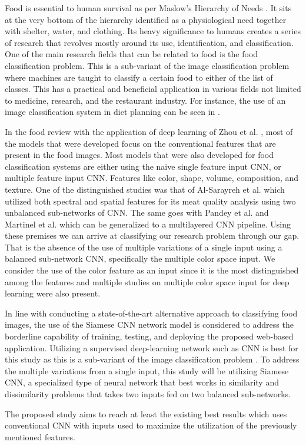 Food is essential to human survival as per Maslow’s Hierarchy of Needs \cite{Mcleod2023}. It sits at the very bottom of the hierarchy identified as a physiological need together with shelter, water, and clothing. Its heavy significance to humans creates a series of research that revolves mostly around its use, identification, and classification. One of the main research fields that can be related to food is the food classification problem. This is a sub-variant of the image classification problem where machines are taught to classify a certain food to either of the list of classes. This has a practical and beneficial application in various fields not limited to medicine, research, and the restaurant industry. For instance, the use of an image classification system in diet planning can be seen in \cite{brintha-2022,chun-2022,dong2019diet,de-kervenoael-2023}. 

In the food review with the application of deep learning of Zhou et al. \cite{zhou-2019}, most of the models that were developed focus on the conventional features that are present in the food images. Most models that were also developed for food classification systems are either using the naive single feature input CNN, or multiple feature input CNN. Features like color, shape, volume, composition, and texture. One of the distinguished studies was that of Al-Sarayreh et al. \cite{al-sarayreh-2018} which utilized both spectral and spatial features for its meat quality analysis using two unbalanced sub-networks of CNN. The same goes with Pandey et al. \cite{pandey-2017} and Martinel et al. \cite{martinel-2018} which can be generalized to a multilayered CNN pipeline. Using these premises we can arrive at classifying our research problem through our gap. That is the absence of the use of multiple variations of a single input using a balanced sub-network CNN, specifically the multiple color space input. We consider the use of the color feature as an input since it is the most distinguished among the features and multiple studies on multiple color space input for deep learning were also present.

In line with conducting a state-of-the-art alternative approach to classifying food images, the use of the Siamese CNN network model is considered to address the borderline capability of training, testing, and deploying the proposed web-based application. Utilizing a supervised deep-learning network such as CNN is best for this study as this is a sub-variant of the image classification problem \cite{sarker-2021}. To address the multiple variations from a single input, this study will be utilizing Siamese CNN, a specialized type of neural network that best works in similarity and dissimilarity problems that takes two inputs fed on two balanced sub-networks.

The proposed study aims to reach at least the existing best results which uses conventional CNN with inputs used to maximize the utilization of the previously mentioned features. 